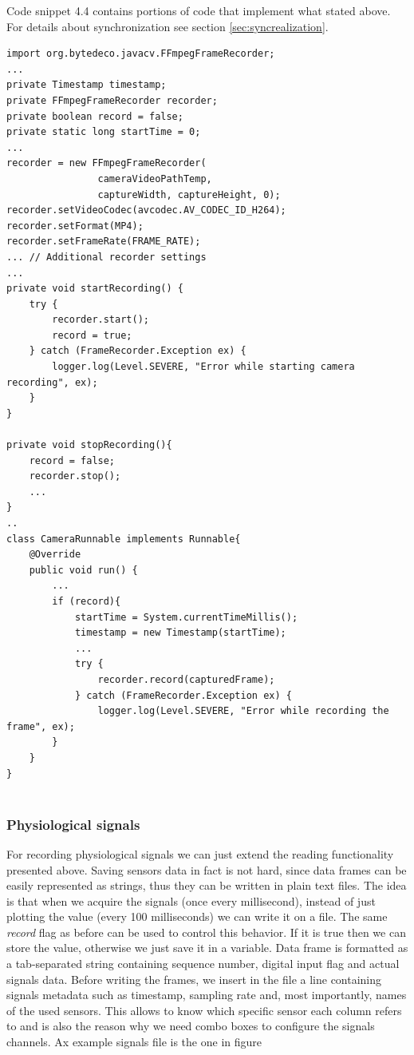 \documentclass[binding=0.6cm,LaM]{sapthesis}
\begin{document}
Code snippet 4.4 contains portions of code that implement what stated above. For details about synchronization see section \ref{sec:syncrealization}.  
\\
\begin{lstlisting}[caption={Camera recording}, captionpos=b]
import org.bytedeco.javacv.FFmpegFrameRecorder;
...
private Timestamp timestamp;
private FFmpegFrameRecorder recorder;
private boolean record = false;
private static long startTime = 0;
...
recorder = new FFmpegFrameRecorder(
                cameraVideoPathTemp,
                captureWidth, captureHeight, 0);
recorder.setVideoCodec(avcodec.AV_CODEC_ID_H264);
recorder.setFormat(MP4);
recorder.setFrameRate(FRAME_RATE);
... // Additional recorder settings
... 
private void startRecording() {
	try {
		recorder.start();
		record = true;
	} catch (FrameRecorder.Exception ex) {
		logger.log(Level.SEVERE, "Error while starting camera recording", ex);
	}
}

private void stopRecording(){
	record = false;
	recorder.stop(); 
	...
}
..
class CameraRunnable implements Runnable{
	@Override
	public void run() {
		...
		if (record){
			startTime = System.currentTimeMillis();
			timestamp = new Timestamp(startTime);
        	...
			try {
				recorder.record(capturedFrame);
			} catch (FrameRecorder.Exception ex) {
				logger.log(Level.SEVERE, "Error while recording the frame", ex);
		}   
    }
}
        
\end{lstlisting}

\subsubsection{Physiological signals}
For recording physiological signals we can just extend the reading functionality presented above. Saving sensors data in fact is not hard, since data frames can be easily represented as strings, thus they can be written in plain text files. The idea is that when we acquire the signals (once every millisecond), instead of just plotting the value (every 100 milliseconds) we can write it on a file.  
The same \textit{record} flag as before can be used to control this behavior. If it is true then we can store the value, otherwise we just save it in a variable. Data frame is formatted as a tab-separated string containing sequence number, digital input flag and actual signals data.
Before writing the frames, we insert in the file a line containing signals metadata such as timestamp, sampling rate and, most importantly, names of the used sensors. This allows to know which specific sensor each column refers to and is also the reason why we need combo boxes to configure the signals channels. Ax example signals file is the one in figure 
\end{document}
